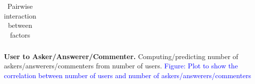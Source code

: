 \begin{table}[h!]
\begin{tabular}{m{} c}
\begin{minipage}{.175\textwidth}
    \end{minipage}
    \\
    \hline
  \end{tabular}
  \caption{Pairwise interaction between factors}
  \label{tab:interaction}
\end{table}

\textbf{User to Asker/Answerer/Commenter.} Computing/predicting number of askers/answerers/commenters from number of users. \textcolor{blue}{Figure: Plot to show the correlation between number of users and number of askers/answerers/commenters}



